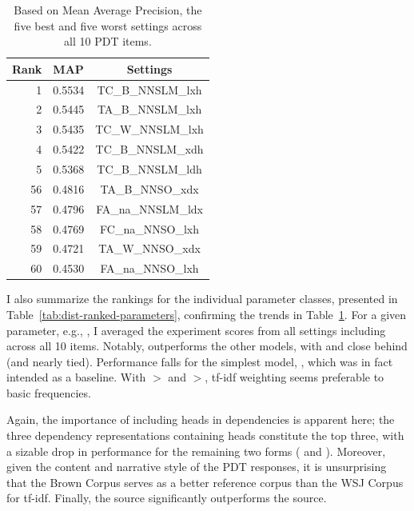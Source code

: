 \begin{table}[htb!]
\begin{center}
\begin{tabular}{|r|l|c|}
\hline
Rank & MAP & Settings \\
\hline
\hline
1 & 0.5534 & TC\_B\_NNSLM\_lxh \\
\hline
2 & 0.5445 & TA\_B\_NNSLM\_lxh \\
\hline
3 & 0.5435 & TC\_W\_NNSLM\_lxh \\
\hline
4 & 0.5422 & TC\_B\_NNSLM\_xdh \\
\hline
5 & 0.5368 & TC\_B\_NNSLM\_ldh \\
\hline
\hline
56 & 0.4816 & TA\_B\_NNSO\_xdx \\
\hline
57 & 0.4796 & FA\_na\_NNSLM\_ldx \\
\hline
58 & 0.4769 & FC\_na\_NNSO\_lxh \\
\hline
59 & 0.4721 & TA\_W\_NNSO\_xdx \\
\hline
60 & 0.4530 & FA\_na\_NNSO\_lxh \\
\hline
\end{tabular}
\caption{Based on Mean Average Precision, the five best and five worst settings across all 10 PDT items.}
\label{tab:all-dist-ranked-settings}
\end{center}
\end{table}

I also summarize the rankings for the individual parameter classes,
presented in Table~\ref{tab:dist-ranked-parameters}, confirming the
trends in Table~\ref{tab:all-dist-ranked-settings}. For a given
parameter, e.g., , I averaged the experiment scores from
all settings including  across all 10 items. Notably,  outperforms the other models, with  and  close behind (and nearly tied). Performance falls for the simplest model, , which was in fact intended as a baseline. With $>$ and $>$, tf-idf weighting seems preferable to basic frequencies.

Again, the importance of including heads in dependencies is apparent here; the three dependency representations containing heads constitute the top three, with a sizable drop in performance for the remaining two forms ( and ). Moreover, given the content and narrative style of the PDT responses, it is unsurprising that the Brown Corpus serves as a better reference corpus than the WSJ Corpus for tf-idf. Finally, the  source significantly outperforms the  source.

